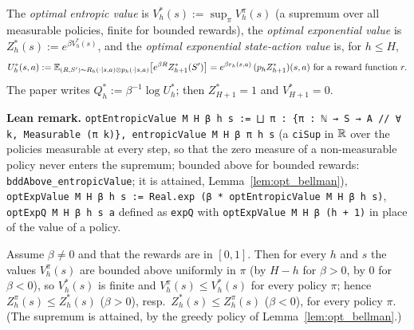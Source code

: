 \begin{definition}\label{def:opt_value}
\leanok
{}
The \emph{optimal entropic value} is $V^*_h(s) := \sup_\pi V^\pi_h(s)$ (a supremum over all
measurable policies, finite for bounded rewards), the \emph{optimal exponential value} is $Z^*_h(s) := e^{\beta V^*_h(s)}$, and the
\emph{optimal exponential state-action value} is, for $h \le H$,
\[
  U^*_h(s, a) := \mathbb{E}_{(R, S') \sim R_h(\cdot \mid s, a) \otimes p_h(\cdot \mid s, a)}
    \big[e^{\beta R} Z^*_{h+1}(S')\big]
  = e^{\beta r_h(s, a)}\,(p_h Z^*_{h+1})(s, a) \text{ for a reward function } r .
\]
The paper writes $Q^*_h := \beta^{-1} \log U^*_h$; then $Z^*_{H+1} = 1$ and $V^*_{H+1} = 0$.
\end{definition}

\textbf{Lean remark.} \texttt{optEntropicValue M H β h s := ⨆ π : \{π : ℕ → S → A // ∀ k, Measurable (π k)\}, entropicValue M H β π h s}
(a \texttt{ciSup} in $\mathbb{R}$ over the policies measurable at every step, so that the zero measure
of a non-measurable policy never enters the supremum; bounded above for bounded rewards:
\texttt{bddAbove\_entropicValue}; it is attained, Lemma~\ref{lem:opt_bellman}),
\texttt{optExpValue M H β h s := Real.exp (β * optEntropicValue M H β h s)},
\texttt{optExpQ M H β h s a} defined as \texttt{expQ} with \texttt{optExpValue M H β (h + 1)} in
place of the value of a policy.

\begin{lemma}\label{lem:opt_exp_value_eq}
\leanok
{}
Assume $\beta \ne 0$ and that the rewards are in $[0, 1]$. Then for every $h$ and $s$ the values
$V^\pi_h(s)$ are bounded above uniformly in $\pi$ (by $H - h$ for $\beta > 0$, by $0$ for
$\beta < 0$), so $V^*_h(s)$ is finite and $V^\pi_h(s) \le V^*_h(s)$ for every policy $\pi$; hence
$Z^\pi_h(s) \le Z^*_h(s)$ ($\beta > 0$), resp.\ $Z^*_h(s) \le Z^\pi_h(s)$ ($\beta < 0$), for every
policy $\pi$. (The supremum is attained, by the greedy policy of Lemma~\ref{lem:opt_bellman}.)
\end{lemma}

